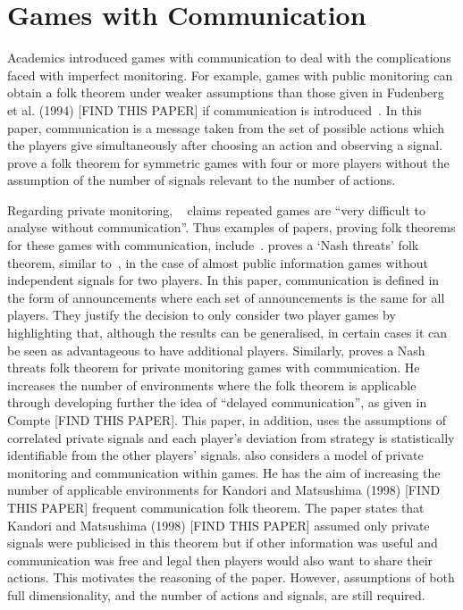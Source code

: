 \section{Games with Communication}\label{sec:Games_with_Communication} 
Academics introduced games with communication to deal with the complications
faced with imperfect monitoring. For example, games with public monitoring can
obtain a folk theorem under weaker assumptions than those given in Fudenberg et
al. (1994) [FIND THIS PAPER] if communication is introduced~\cite{Kandori2003}.
In this paper, communication is a message taken from the set of possible actions
which the players give simultaneously after choosing an action and observing a
signal. \cite{Kandori2003} prove a folk theorem for symmetric games with four or
more players without the assumption of the number of signals relevant to the
number of actions.

Regarding private monitoring, ~\cite{Obara2009} claims repeated games are ``very
difficult to analyse without communication''. Thus examples of papers, proving
folk theorems for these games with communication, include~\cite{Fudenberg2008,
Obara2009, Li2010}. \cite{Fudenberg2008} proves a `Nash threats' folk theorem,
similar to~\cite{Friedman1971}, in the case of almost public information games
without independent signals for two players. In this paper, communication is
defined in the form of announcements where each set of announcements is the same
for all players. They justify the decision to only consider two player games by
highlighting that, although the results can be generalised, in certain cases it
can be seen as advantageous to have additional players. Similarly,
\cite{Obara2009} proves a Nash threats folk theorem for private monitoring games
with communication. He increases the number of environments where the folk
theorem is applicable through developing further the idea of ``delayed
communication'', as given in Compte [FIND THIS PAPER]. This paper, in addition,
uses the assumptions of correlated private signals and each player's deviation
from strategy is statistically identifiable from the other players' signals.
\cite{Li2010} also considers a model of private monitoring and communication
within games. He has the aim of increasing the number of applicable
environments for Kandori and Matsushima (1998) [FIND THIS PAPER] frequent
communication folk theorem. The paper states that Kandori and Matsushima (1998)
[FIND THIS PAPER] assumed only private signals were publicised in this theorem
but if other information was useful and communication was free and legal then
players would also want to share their actions. This motivates the reasoning of
the paper. However, assumptions of both full dimensionality, and the number of
actions and signals, are still required. 

